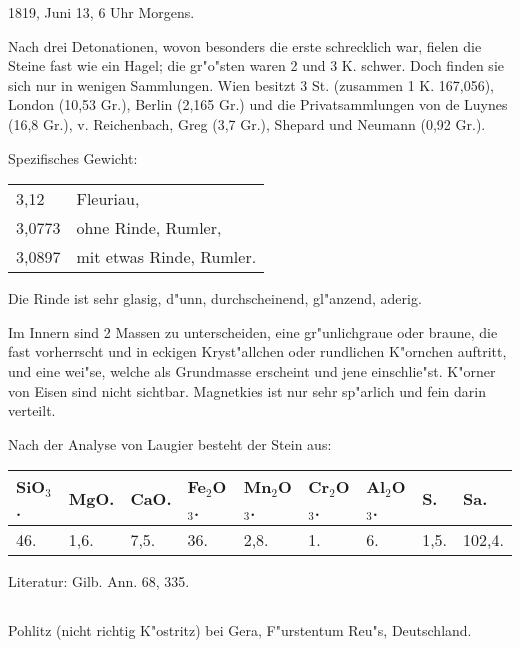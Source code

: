 \documentclass[a4paper, 11pt, oneside]{article}
\begin{document}
1819, Juni 13, 6 Uhr Morgens.

Nach drei Detonationen, wovon besonders die erste schrecklich war, fielen die Steine fast wie ein Hagel; die gr"o"sten waren 2 und 3 K. schwer. Doch finden sie sich nur in wenigen Sammlungen. Wien besitzt 3 St. (zusammen 1 K. 167,056), London (10,53 Gr.), Berlin (2,165 Gr.) und die Privatsammlungen von de Luynes (16,8 Gr.), v. Reichenbach, Greg (3,7 Gr.), Shepard und Neumann (0,92 Gr.).

Spezifisches Gewicht:
\begin{table}[!ht]
    \centering\swabfamily\Large
    \begin{tabular}{l l}
        3,12 & Fleuriau,\\
        3,0773 & ohne Rinde, Rumler,\\
        3,0897 & mit etwas Rinde, Rumler.
    \end{tabular}
\end{table}

Die Rinde ist sehr glasig, d"unn, durchscheinend, gl"anzend, aderig.

Im Innern sind 2 Massen zu unterscheiden, eine gr"unlichgraue oder braune, die fast vorherrscht und in eckigen Kryst"allchen oder rundlichen K"ornchen auftritt, und eine wei"se, welche als Grundmasse erscheint und jene einschlie"st. K"orner von Eisen sind nicht sichtbar. Magnetkies ist nur sehr sp"arlich und fein darin verteilt.

Nach der Analyse von Laugier besteht der Stein aus:
\begin{table}[!ht]
    \centering\swabfamily\Large
    \normalsize
    \begin{tabular}{l l l l l l l l l}
        SiO$_{3}$. & MgO. & CaO. & Fe$_{2}$O$_{3}$. & Mn$_{2}$O$_{3}$. & Cr$_{2}$O$_{3}$. & Al$_{2}$O$_{3}$. & S. & Sa. \\ \hline
        46. & 1,6. & 7,5. & 36. & 2,8. & 1. & 6. & 1,5. & 102,4. \\
    \end{tabular}
\end{table}

\normalsize
Literatur: Gilb. Ann. 68, 335.
\subsection{}
\LARGE
\paragraph{}
Pohlitz (nicht richtig K"ostritz) bei Gera, F"urstentum Reu"s, Deutschland.
\end{document}
